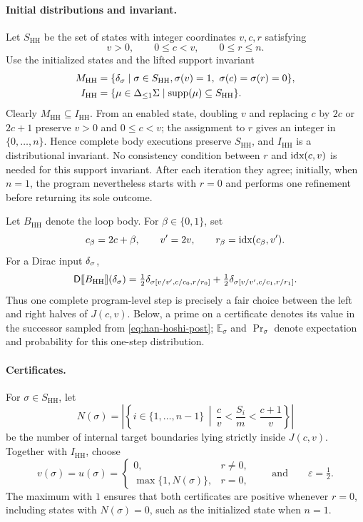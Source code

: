 \paragraph{Initial distributions and invariant.}
Let $S_{\mathrm{HH}}$ be the set of states with integer coordinates
$v,c,r$ satisfying
\begin{equation}
 v>0,\qquad 0\le c<v,\qquad 0\le r\le n.
 \label{eq:han-hoshi-support}
\end{equation}
Use the initialized states and the lifted support invariant
\[
 \begin{aligned}
 M_{\mathrm{HH}}
   &=\{\delta_{\sigma}\mid\sigma\in S_{\mathrm{HH}},
       \sigma(v)=1,\ \sigma(c)=\sigma(r)=0\},\\
 I_{\mathrm{HH}}
   &=\{\mu\in{\Delta_{\leq 1}\Sigma}\mid\textnormal{supp}(\mu)\subseteq S_{\mathrm{HH}}\}.
 \end{aligned}
\]
Clearly $M_{\mathrm{HH}}\subseteq I_{\mathrm{HH}}$. From an enabled
state, doubling $v$ and replacing $c$ by $2c$ or $2c+1$ preserve
$v>0$ and $0\leq c<v$; the assignment to $r$ gives an integer in
$\{0,\ldots,n\}$. Hence complete body executions preserve
$S_{\mathrm{HH}}$, and $I_{\mathrm{HH}}$ is a distributional invariant.
No consistency condition between $r$ and $\textnormal{idx}(c,v)$ is needed for this
support invariant. After each iteration they agree; initially, when
$n=1$, the program nevertheless starts with $r=0$ and performs one
refinement before returning its sole outcome.

Let $B_{\mathrm{HH}}$ denote the loop body. For $\beta\in\{0,1\}$, set
\[
 c_\beta=2c+\beta,\qquad v'=2v,\qquad r_\beta=\textnormal{idx}(c_\beta,v').
\]
For a Dirac input $\delta_{\sigma}$,
\begin{equation}
 \mathsf{D}\llbracket B_{\mathrm{HH}}\rrbracket(\delta_{\sigma})
 =\tfrac12\delta_{\sigma[v/v',c/c_0,r/r_0]}
 +\tfrac12\delta_{\sigma[v/v',c/c_1,r/r_1]}.
 \label{eq:han-hoshi-post}
\end{equation}
Thus one complete program-level step is precisely a fair choice between
the left and right halves of $J(c,v)$. Below, a prime on a certificate
denotes its value in the successor sampled from
\eqref{eq:han-hoshi-post}; $\mathbb E_\sigma$ and $\Pr\nolimits_\sigma$
denote expectation and probability for this one-step distribution.

\paragraph{Certificates.}
For $\sigma\in S_{\mathrm{HH}}$, let
\[
 N(\sigma)
 =\left|\left\{i\in\{1,\ldots,n-1\}\,\middle|\,
 \frac cv<\frac{S_i}{m}<\frac{c+1}{v}\right\}\right|
\]
be the number of internal target boundaries lying strictly inside
$J(c,v)$. Together with $I_{\mathrm{HH}}$, choose
\[
 v(\sigma)=u(\sigma)=
 \begin{cases}
 0,&r\ne0,\\
 \max\{1,N(\sigma)\},&r=0,
 \end{cases}
 \qquad\text{and}\qquad \varepsilon=\tfrac12.
\]
The maximum with $1$ ensures that both certificates are positive
whenever $r=0$, including states with $N(\sigma)=0$, such as the
initialized state when $n=1$.

